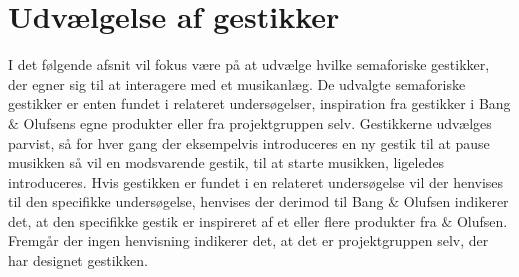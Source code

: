 \section{Udvælgelse af gestikker}
\label{UdvaelgelseAfGestikker}
%
I det følgende afsnit vil fokus være på at udvælge hvilke semaforiske gestikker, der egner sig til at interagere med et musikanlæg. De udvalgte semaforiske gestikker er enten fundet i relateret undersøgelser, inspiration fra gestikker i Bang $\&$ Olufsens egne produkter eller fra projektgruppen selv. Gestikkerne udvælges parvist, så for hver gang der eksempelvis introduceres en ny gestik til at pause musikken så vil en modsvarende gestik, til at starte musikken, ligeledes introduceres. Hvis gestikken er fundet i en relateret undersøgelse vil der henvises til den specifikke undersøgelse, henvises der derimod til Bang $\&$ Olufsen indikerer det, at den specifikke gestik er	inspireret af et eller flere produkter fra $\&$ Olufsen. Fremgår der ingen henvisning indikerer det, at det er projektgruppen selv, der har designet gestikken.  

